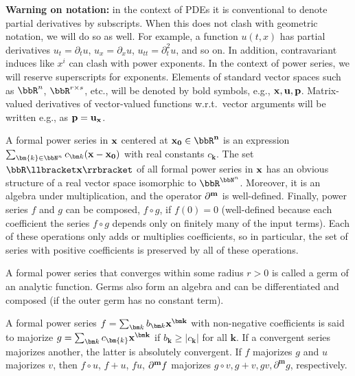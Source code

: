 \textbf{Warning on notation:} in the context of PDEs it is conventional to denote partial derivatives by subscripts. When this does not clash with geometric notation, we will do so as well. For example, a function $u(t,x)$ has partial derivatives $u_t=\partial_t u$, $u_{x}=\partial_x u$, $u_{tt}=\partial_t^2 u$, and so on. In addition, contravariant induces like $x^i$ can clash with power exponents. In the context of power series, we will reserve superscripts for exponents. Elements of standard vector spaces such as $\bbR^n$, $\bbR^{r\times s}$, etc., will be denoted by bold symbols, e.g., $\bf{x},\bf{u},\bf{p}$. Matrix-valued derivatives of vector-valued functions w.r.t.\ vector arguments will be written e.g., as $\bf{p}=\bf{u}_{\bf{x}}$.

\begin{defn}
    A formal power series in $\bf{x}$ centered at $\bf{x}_0\in\bbR^n$ is an expression $\sum_{\bm{k}\in\bbN^n}c_{\bm k}(\bf{x}-\bf{x}_0)$ with real constants $c_{\bm k}$. The set $\bbR\llbracket\bf{x}\rrbracket$ of all formal power series in $\bf{x}$ has an obvious structure of a real vector space isomorphic to $\bbR^{\bbN^n}$. Moreover, it is an algebra under multiplication, and the operator $\partial^{\bf{m}}$ is well-defined. Finally, power series $f$ and $g$ can be composed, $f\circ g$, if $f(0)=0$ (well-defined because each coefficient the series $f\circ g$ depends only on finitely many of the input terms). Each of these operations only adds or multiplies coefficients, so in particular, the set of series with positive coefficients is preserved by all of these operations.
\end{defn}

\begin{defn}
    A formal power series that converges within some radius $r>0$ is called a germ of an analytic function. Germs also form an algebra and can be differentiated and composed (if the outer germ has no constant term).
\end{defn}

\begin{defn}[Majorants]
    A formal power series $f=\sum_{\bm k} b_{\bm k}\bf{x}^{\bm k}$ with non-negative coefficients is said to majorize $g=\sum_{\bm k} c_{\bm{k}}\bf{x}^{\bm k}$ if $b_{\bm k}\geq |c_{\bm k}|$ for all $\bm{k}$. If a convergent series majorizes another, the latter is absolutely convergent. If $f$ majorizes $g$ and $u$ majorizes $v$, then $f\circ u$, $f+u$, $fu$, $\partial^{\bf{m}}f$ majorizes $g\circ v,g+v,gv,\partial^{\bm m}g$, respectively. 
\end{defn}


